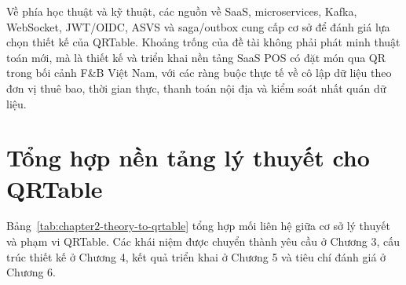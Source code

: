 Về phía học thuật và kỹ thuật, các nguồn về SaaS, microservices, Kafka, WebSocket, JWT/OIDC, ASVS và saga/outbox cung cấp cơ sở để đánh giá lựa chọn thiết kế của QRTable. Khoảng trống của đề tài không phải phát minh thuật toán mới, mà là thiết kế và triển khai nền tảng SaaS POS có đặt món qua QR trong bối cảnh F\&B Việt Nam, với các ràng buộc thực tế về cô lập dữ liệu theo đơn vị thuê bao, thời gian thực, thanh toán nội địa và kiểm soát nhất quán dữ liệu.

\section{Tổng hợp nền tảng lý thuyết cho QRTable}

Bảng~\ref{tab:chapter2-theory-to-qrtable} tổng hợp mối liên hệ giữa cơ sở lý thuyết và phạm vi QRTable. Các khái niệm được chuyển thành yêu cầu ở Chương 3, cấu trúc thiết kế ở Chương 4, kết quả triển khai ở Chương 5 và tiêu chí đánh giá ở Chương 6.

